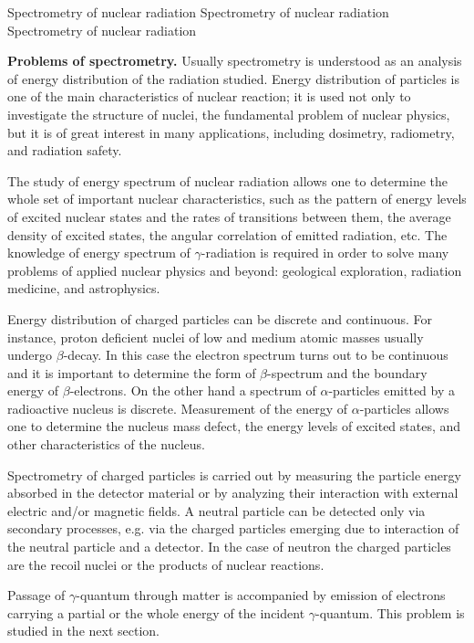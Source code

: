 
\let\theEquation=\oldTheEquation
\let\theFigure=\oldTheFigure

\Chapter
{Spectrometry of nuclear radiation}
{Spectrometry of nuclear radiation}
{Spectrometry of nuclear radiation}

\textbf{Problems of spectrometry.}
Usually spectrometry is understood as an analysis of energy distribution of the radiation studied. Energy distribution of particles is one of the main characteristics of nuclear reaction; it is used not only to investigate the structure of nuclei, the fundamental problem of nuclear physics, but it is of great interest in many applications, including dosimetry, radiometry, and radiation safety.

The study of energy spectrum of nuclear radiation allows one to determine the whole set of important nuclear characteristics, such as the pattern of energy levels of excited nuclear states and the rates of transitions between them, the average density of excited states, the angular correlation of emitted radiation, etc. The knowledge of energy spectrum of $\gamma$-radiation is required in order to solve many problems of applied nuclear physics and beyond: geological exploration, radiation medicine, and astrophysics.

Energy distribution of charged particles can be discrete and continuous. For instance, proton deficient nuclei of low and medium atomic masses usually undergo $\beta$-decay. In this case the electron spectrum turns out to be continuous and it is important to determine the form of $\beta$-spectrum and the boundary energy of $\beta$-electrons. On the other hand a spectrum of $\alpha$-particles emitted by a radioactive nucleus is discrete. Measurement of the energy of $\alpha$-particles allows one to determine the nucleus mass defect, the energy levels of excited states, and other characteristics of the nucleus.

Spectrometry of charged particles is carried out by measuring the particle energy absorbed in the detector material or by analyzing their interaction with external electric and/or magnetic fields. A neutral particle can be detected only via secondary processes, e.g. via the charged particles  emerging due to interaction of the neutral particle and a detector. In the case of neutron the charged particles are the recoil nuclei or the products of nuclear reactions.

Passage of \mbox{$\gamma$-quantum} through matter is accompanied by emission of electrons carrying a partial or the whole energy of the incident \mbox{$\gamma$-quantum}. This problem is studied in the next section.
\vspace{1ex}

